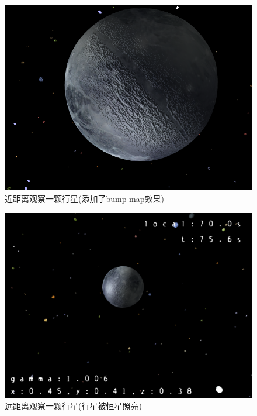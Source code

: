 \documentclass[a4paper,12pt,titlepage]{article}
\begin{document}
\begin{figure}[H]
\centering
	\includegraphics[scale=0.3]{03.png}
	\caption{近距离观察一颗行星(添加了bump map效果)}
\end{figure}
	
\begin{figure}[H]
\centering
	\includegraphics[scale=0.3]{04.png}
	\caption{远距离观察一颗行星(行星被恒星照亮)}
\end{figure}
	
\end{document}
